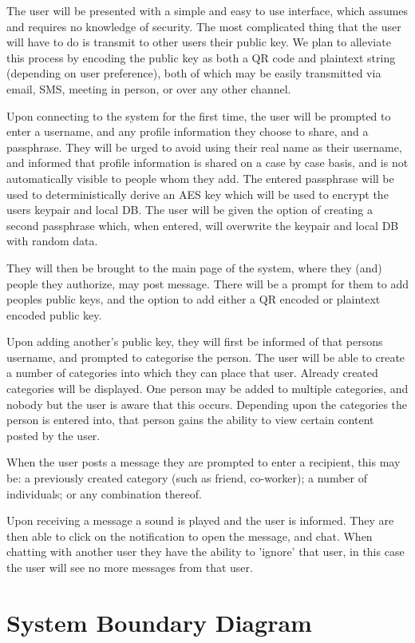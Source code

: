 The user will be presented with a simple and easy to use interface, which
assumes and requires no knowledge of security. The most complicated thing that
the user will have to do is transmit to other users their public key. We plan
to alleviate this process by encoding the public key as both a QR code and
plaintext string (depending on user preference), both of which may be easily
transmitted via email, SMS, meeting in person, or over any other channel.

Upon connecting to the system for the first time, the user will be prompted to
enter a username, and any profile information they choose to share, and a
passphrase. They will be urged to avoid using their real name as their username,
and informed that profile information is shared on a case by case basis, and is
not automatically visible to people whom they add. The entered passphrase will
be used to deterministically derive an AES key which will be used to encrypt the
users keypair and local DB. The user will be given the option of creating a
second passphrase which, when entered, will overwrite the keypair and local DB
with random data.

They will then be brought to the main page of the system, where they (and)
people they authorize, may post message. There will be a prompt for them to add
peoples public keys, and the option to add either a QR encoded or plaintext
encoded public key.

Upon adding another's public key, they will first be informed of that persons
username, and prompted to categorise the person. The user will be able to create
a number of categories into which they can place that user. Already created
categories will be displayed. One person may be added to multiple categories,
and nobody but the user is aware that this occurs. Depending upon the categories
the person is entered into, that person gains the ability to view certain
content posted by the user.

When the user posts a message they are prompted to enter a recipient, this may
be: a previously created category (such as friend, co-worker); a number
of individuals; or any combination thereof.

Upon receiving a message a sound is played and the user is informed. They are
then able to click on the notification to open the message, and chat. When
chatting with another user they have the ability to 'ignore' that user, in this
case the user will see no more messages from that user.

\section{System Boundary Diagram}

